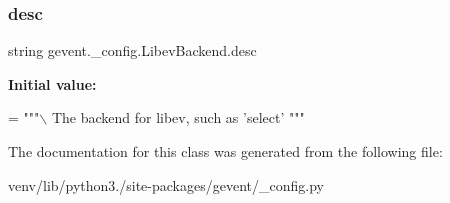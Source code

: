 \subsubsection{\texorpdfstring{desc}{desc}}
{\footnotesize\ttfamily string gevent.\+\_\+config.\+Libev\+Backend.\+desc\hspace{0.3cm}{\ttfamily [static]}}

{\bfseries Initial value\+:}
\begin{DoxyCode}
=  \textcolor{stringliteral}{"""\(\backslash\)}
\textcolor{stringliteral}{The backend for libev, such as 'select'}
\textcolor{stringliteral}{"""}
\end{DoxyCode}


The documentation for this class was generated from the following file\+:\begin{DoxyCompactItemize}
\item 
venv/lib/python3./site-\/packages/gevent/\+\_\+config.\+py\end{DoxyCompactItemize}
